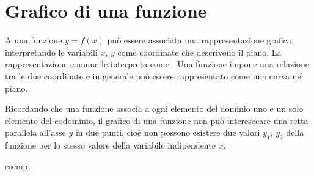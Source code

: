 \documentclass[letterpaper,10pt,italian]{jupyterBook}
\begin{document}
\section{Grafico di una funzione}
\label{\detokenize{ch/precalculus/real-functions:grafico-di-una-funzione}}\label{\detokenize{ch/precalculus/real-functions:math-hs-precalculus-real-functions-inverse-plot}}
\sphinxAtStartPar
A una funzione \(y = f(x)\) può essere associata una rappresentazione grafica, interpretando le variabili \(x\), \(y\) come coordinate che descrivono il piano. La rappresentazione comune le interpreta come . Una funzione impone una relazione tra le due coordinate e in generale può essere rappresentato come una curva nel piano.

\sphinxAtStartPar
Ricordando che una funzione associa a ogni elemento del dominio uno e un solo elemento del codominio, il grafico di una funzione non può interesecare una retta parallela all’asse \(y\) in due punti, cioè non possono esistere due valori \(y_1\), \(y_2\) della funzione per lo stesso valore della variabile indipendente \(x\).

\sphinxAtStartPar
{} esempi
\end{document}
